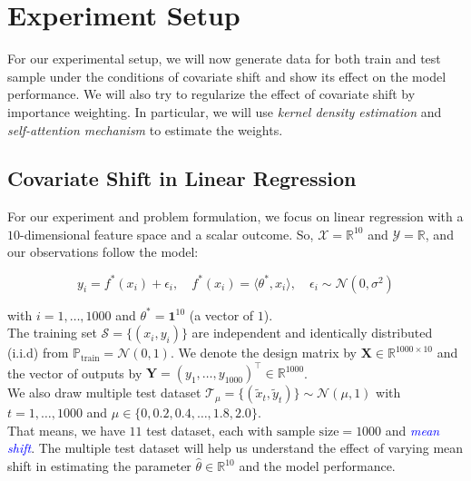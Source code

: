 \chapter{Experiment Setup}\label{chp:6}

For our experimental setup, we will now generate data for both train and test sample under the conditions of covariate shift and show its effect on the model performance. We will also try to regularize the effect of covariate shift by importance weighting. In particular, we will use \emph{kernel density estimation} and \emph{self-attention mechanism} to estimate the weights.

\section{Covariate Shift in Linear Regression}

For our experiment and problem formulation, we focus on linear regression with a $10$-dimensional feature space and a scalar outcome. So, $\mathcal{X} = \mathbb{R}^{10}$ and $\mathcal{Y} = \mathbb{R}$, and our observations follow the model:

\begin{equation}
    y_i = f^*(x_i) + \epsilon_i, \quad f^*(x_i) = \langle \theta^*, x_i \rangle, \quad \epsilon_i \sim \mathcal{N}(0, \sigma^2)
    \label{eqn:6.1}
\end{equation}

\vspace{1em}
with $i = 1, \ldots, 1000$ and $\theta^* = \mathbf{1}^{10}$ (a vector of $1$). \\

The training set $\mathcal{S} = \{ (x_i, y_i) \}$ are independent and identically distributed (i.i.d) from $\mathbb{P}_{\text{train}} = \mathcal{N}(0, 1)$. We denote the design matrix by $\mathbf{X} \in \mathbb{R}^{1000 \times 10}$ and the vector of outputs by $\mathbf{Y} = (y_1, \ldots, y_{1000})^\top \in \mathbb{R}^{1000}$.\\

We also draw multiple test dataset $\mathcal{T}_{\mu} = \{ (\tilde{x}_t, \tilde{y}_t) \} \sim \mathcal{N}(\mu, 1)$ with $t = 1, \ldots, 1000$ and $\mu \in \{ 0, 0.2, 0.4, \ldots, 1.8, 2.0 \}$.\\

That means, we have $11$ test dataset, each with $\text{sample size} = 1000$ and \textcolor{blue}{\emph{mean shift}}. The multiple test dataset will help us understand the effect of varying mean shift in estimating the parameter $\hat{\theta} \in \mathbb{R}^{10}$ and the model performance.\\

